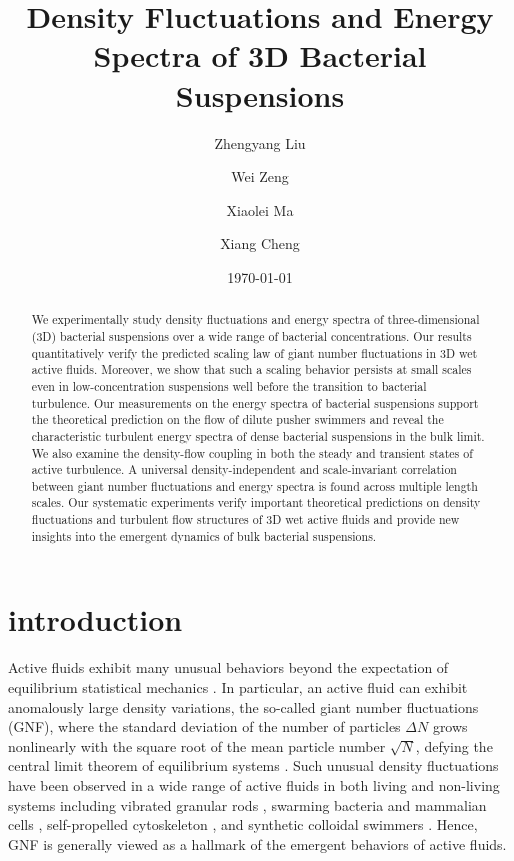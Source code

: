 \documentclass[twocolumn,aps,prx,amsmath,amssymb,longbibliography]{revtex4-2}
\begin{document}
\title{Density Fluctuations and Energy Spectra of 3D Bacterial Suspensions}

\author{Zhengyang Liu}
\author{Wei Zeng}
\author{Xiaolei Ma}
\author{Xiang Cheng}



\date{\today}


\begin{abstract}
We experimentally study density fluctuations and energy spectra of three-dimensional (3D) bacterial suspensions over a wide range of bacterial concentrations. Our results quantitatively verify the predicted scaling law of giant number fluctuations in 3D wet active fluids. Moreover, we show that such a scaling behavior persists at small scales even in low-concentration suspensions well before the transition to bacterial turbulence. Our measurements on the energy spectra of bacterial suspensions support the theoretical prediction on the flow of dilute pusher swimmers and reveal the characteristic turbulent energy spectra of dense bacterial suspensions in the bulk limit. We also examine the density-flow coupling in both the steady and transient states of active turbulence. A universal density-independent and scale-invariant correlation between giant number fluctuations and energy spectra is found across multiple length scales. Our systematic experiments verify important theoretical predictions on density fluctuations and turbulent flow structures of 3D wet active fluids and provide new insights into the emergent dynamics of bulk bacterial suspensions.

\end{abstract}

\maketitle

\section{introduction}

Active fluids exhibit many unusual behaviors beyond the expectation of equilibrium statistical mechanics \cite{Ramaswamy2010,Cates2012,Marchetti2013,Poon2013,Elgeti2015}.
In particular, an active fluid can exhibit anomalously large density variations, the so-called giant number fluctuations (GNF), where the standard deviation of the number of particles $\Delta N$ grows nonlinearly with the square root of the mean particle number $\sqrt N$, defying the central limit theorem of equilibrium systems \cite{Mishin2015}.
Such unusual density fluctuations have been observed in a wide range of active fluids in both living and non-living systems including vibrated granular rods \cite{Narayan2007,Aranson2008,Kudrolli2008,Deseigne2010}, swarming bacteria \cite{Zhang2010,Nishiguchi2017} and mammalian cells \cite{Kawaguchi2017},
self-propelled cytoskeleton \cite{Schaller2013}, and synthetic colloidal swimmers \cite{Palacci2013,Karani2019}. Hence, GNF is generally viewed as a hallmark of the emergent behaviors of active fluids.
\end{document}

